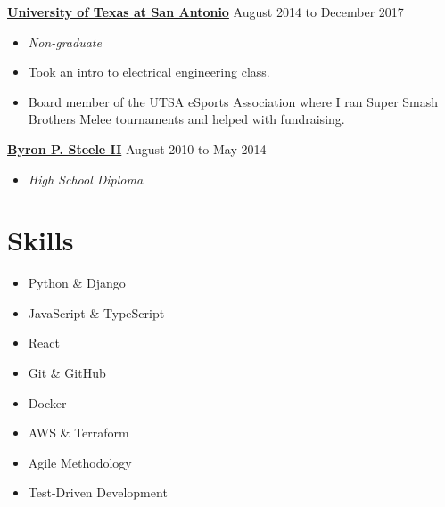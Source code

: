 \documentclass[10pt]{article}
\begin{document}
  \textbf{\href{https://www.utsa.edu/}{University of Texas at San Antonio}} \hfill {August 2014 to December 2017}
   \begin{itemize}
     \item[] \textit{Non-graduate}
     \item[] Took an intro to electrical engineering class.
     \item[] Board member of the UTSA eSports Association where I ran Super Smash Brothers Melee tournaments and helped with fundraising.
   \end{itemize}

  \textbf{\href{https://www.scuc.txed.net/ByronSteele}{Byron P. Steele II}} \hfill {August 2010 to May 2014}
   \begin{itemize}
     \item[] \textit{High School Diploma}
   \end{itemize}

  \section*{Skills}

   \begin{multicols}{2}
   \begin{itemize}
        \item[] Python \& Django
        \item[] JavaScript \& TypeScript
        \item[] React
        \item[] Git \& GitHub
        \item[] Docker
        \item[] AWS \& Terraform
        \item[] Agile Methodology
        \item[] Test-Driven Development
   \end{itemize}
   \end{multicols}
\end{document}
